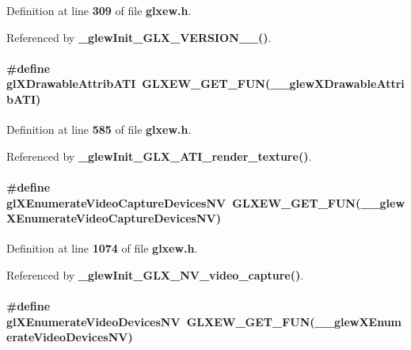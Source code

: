 Definition at line {\bf 309} of file {\bf glxew.\+h}.



Referenced by {\bf \+\_\+glew\+Init\+\_\+\+G\+L\+X\+\_\+\+V\+E\+R\+S\+I\+O\+N\+\_\+\_()}.

\paragraph[{gl\+X\+Drawable\+Attrib\+A\+TI}]{\setlength{\rightskip}{0pt plus 5cm}\#define gl\+X\+Drawable\+Attrib\+A\+TI~{\bf G\+L\+X\+E\+W\+\_\+\+G\+E\+T\+\_\+\+F\+UN}({\bf \+\_\+\+\_\+glew\+X\+Drawable\+Attrib\+A\+TI})}\label{glxew_8h_abd1031743a325d5b06c9104633b6d123}


Definition at line {\bf 585} of file {\bf glxew.\+h}.



Referenced by {\bf \+\_\+glew\+Init\+\_\+\+G\+L\+X\+\_\+\+A\+T\+I\+\_\+render\+\_\+texture()}.

\paragraph[{gl\+X\+Enumerate\+Video\+Capture\+Devices\+NV}]{\setlength{\rightskip}{0pt plus 5cm}\#define gl\+X\+Enumerate\+Video\+Capture\+Devices\+NV~{\bf G\+L\+X\+E\+W\+\_\+\+G\+E\+T\+\_\+\+F\+UN}({\bf \+\_\+\+\_\+glew\+X\+Enumerate\+Video\+Capture\+Devices\+NV})}\label{glxew_8h_ae1a1997292c2416e681d67c63f2a8219}


Definition at line {\bf 1074} of file {\bf glxew.\+h}.



Referenced by {\bf \+\_\+glew\+Init\+\_\+\+G\+L\+X\+\_\+\+N\+V\+\_\+video\+\_\+capture()}.

\paragraph[{gl\+X\+Enumerate\+Video\+Devices\+NV}]{\setlength{\rightskip}{0pt plus 5cm}\#define gl\+X\+Enumerate\+Video\+Devices\+NV~{\bf G\+L\+X\+E\+W\+\_\+\+G\+E\+T\+\_\+\+F\+UN}({\bf \+\_\+\+\_\+glew\+X\+Enumerate\+Video\+Devices\+NV})}\label{glxew_8h_afc8d6bca4203efc55918c753cf626389}


